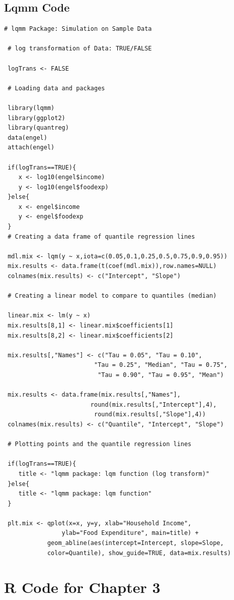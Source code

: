 \documentclass[12pt,a4paper]{report}
\begin{document}
\section{Lqmm Code}\label{App:Engel-Code-lqmm}
\begin{lstlisting}
# lqmm Package: Simulation on Sample Data

 # log transformation of Data: TRUE/FALSE

 logTrans <- FALSE

 # Loading data and packages

 library(lqmm)
 library(ggplot2)
 library(quantreg)
 data(engel)
 attach(engel)

 if(logTrans==TRUE){
    x <- log10(engel$income)
    y <- log10(engel$foodexp)
 }else{
    x <- engel$income
    y <- engel$foodexp
 }
 # Creating a data frame of quantile regression lines

 mdl.mix <- lqm(y ~ x,iota=c(0.05,0.1,0.25,0.5,0.75,0.9,0.95))
 mix.results <- data.frame(t(coef(mdl.mix)),row.names=NULL)
 colnames(mix.results) <- c("Intercept", "Slope")

 # Creating a linear model to compare to quantiles (median)

 linear.mix <- lm(y ~ x)
 mix.results[8,1] <- linear.mix$coefficients[1]
 mix.results[8,2] <- linear.mix$coefficients[2]

 mix.results[,"Names"] <- c("Tau = 0.05", "Tau = 0.10",
                         "Tau = 0.25", "Median", "Tau = 0.75",
                          "Tau = 0.90", "Tau = 0.95", "Mean")

 mix.results <- data.frame(mix.results[,"Names"],
                        round(mix.results[,"Intercept"],4),
                         round(mix.results[,"Slope"],4))
 colnames(mix.results) <- c("Quantile", "Intercept", "Slope")

 # Plotting points and the quantile regression lines

 if(logTrans==TRUE){
    title <- "lqmm package: lqm function (log transform)"
 }else{
    title <- "lqmm package: lqm function"
 }

 plt.mix <- qplot(x=x, y=y, xlab="Household Income",
                ylab="Food Expenditure", main=title) +
            geom_abline(aes(intercept=Intercept, slope=Slope,
            color=Quantile), show_guide=TRUE, data=mix.results)

\end{lstlisting}

\chapter{R Code for Chapter 3}
\end{document}
